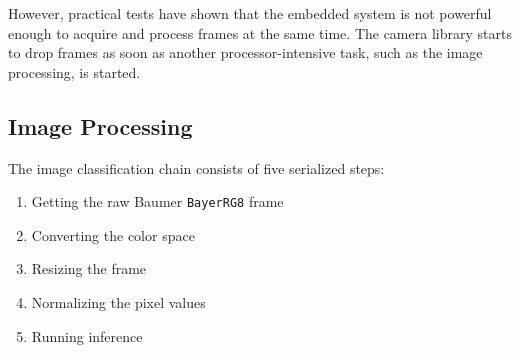 However, practical tests have shown that the embedded system is not powerful enough to acquire and process frames at the same time.
The camera library starts to drop frames as soon as another processor-intensive task, such as the image processing, is started.





















\subsection{Image Processing}
\label{subsec:inference:app:image_processing}

The image classification chain consists of five serialized steps:
\begin{enumerate}
  \item Getting the raw Baumer \texttt{BayerRG8} frame
  \item Converting the color space
  \item Resizing the frame
  \item Normalizing the pixel values
  \item Running inference
\end{enumerate}

